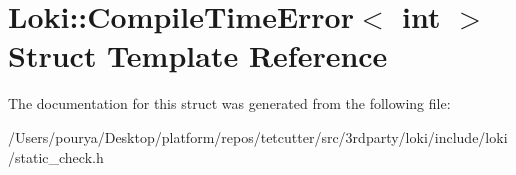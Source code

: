 \hypertarget{structLoki_1_1CompileTimeError}{}\section{Loki\+:\+:Compile\+Time\+Error$<$ int $>$ Struct Template Reference}
\label{structLoki_1_1CompileTimeError}


The documentation for this struct was generated from the following file\+:\begin{DoxyCompactItemize}
\item 
/\+Users/pourya/\+Desktop/platform/repos/tetcutter/src/3rdparty/loki/include/loki/static\+\_\+check.\+h\end{DoxyCompactItemize}
